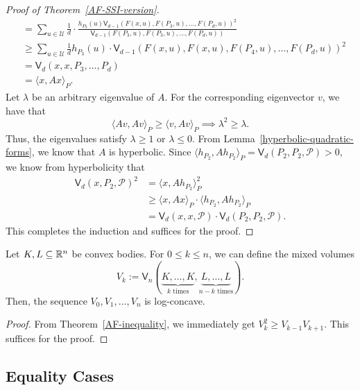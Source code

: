 \documentclass{puthesis-UG}
\begin{document}
\begin{proof}[Proof of Theorem~\ref{AF-SSI-version}]
\begin{align*}
		& = \sum_{u \in \mathcal{U}} \frac{1}{d} \cdot \frac{h_{P_3}(u) \mathsf{V}_{d-1}(F(x, u), F(P_3, u), \ldots, F(P_d, u))^2}{\mathsf{V}_{d-1}(F(P_3, u), F(P_3, u), \ldots, F(P_d, u))} \\
		& \geq \sum_{u \in \mathcal{U}} \frac{1}{d} h_{P_3}(u) \cdot \mathsf{V}_{d-1} (F(x, u), F(x, u), F(P_4, u), \ldots, F(P_d, u))^2 \\
		& = \mathsf{V}_d (x, x, P_3, \ldots, P_d) \\
		& = \langle x, Ax \rangle_P.
	\end{align*}
	Let $\lambda$ be an arbitrary eigenvalue of $A$. For the corresponding eigenvector $v$, we have that 
	\[
		\langle Av, Av \rangle_P \geq \langle v, Av \rangle_P \implies \lambda^2 \geq \lambda. 
	\]
	Thus, the eigenvalues satisfy $\lambda \geq 1$ or $\lambda \leq 0$. From Lemma~\ref{hyperbolic-quadratic-forms}, we know that $A$ is hyperbolic. Since $\langle h_{P_2}, A h_{P_2} \rangle_P = \mathsf{V}_d (P_2, P_2, \mathcal{P}) > 0$, we know from hyperbolicity that 
	\begin{align*}
		\mathsf{V}_d (x, P_2, \mathcal{P})^2 & = \langle x, A h_{P_2} \rangle_P^2 \\
		& \geq \langle x, Ax \rangle_P \cdot \langle h_{P_2}, Ah_{P_2} \rangle_P \\
		& = \mathsf{V}_d(x, x, \mathcal{P}) \cdot \mathsf{V}_d (P_2, P_2, \mathcal{P}).
	\end{align*}
	This completes the induction and suffices for the proof. 
\end{proof}



\begin{cor} \label{AF-log-concavity}
	Let $K, L \subseteq \mathbb{R}^n$ be convex bodies. For $0 \leq k \leq n$, we can define the mixed volumes
	\[
		V_k := \mathsf{V}_n (\underbrace{K, \ldots, K}_{k \text{ times}}, \underbrace{L, \dots, L}_{n-k \text{ times}}).
	\]
	Then, the sequence $V_0, V_1, \ldots, V_n$ is log-concave. 
\end{cor}

\begin{proof}
	From Theorem~\ref{AF-inequality}, we immediately get $V_k^2 \geq V_{k-1}V_{k+1}$. This suffices for the proof. 
\end{proof}



\subsection{Equality Cases} \label{sec:AF-equality-cases}
\end{document}
